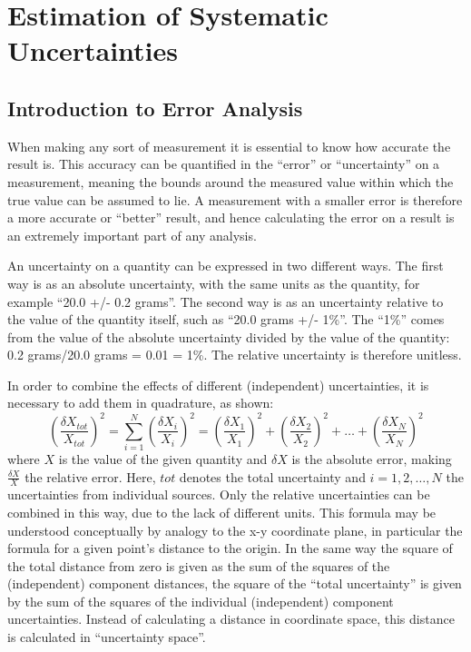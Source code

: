 \section{Estimation of Systematic Uncertainties}
\label{anMeth:Systs}


\subsection{Introduction to Error Analysis}
\label{anMeth:SystsIntro}

When making any sort of measurement it is essential 
to know how accurate the result is.  
This accuracy can be quantified in the 
``error'' or ``uncertainty'' 
on a measurement, 
meaning the bounds around the measured value 
within which the true value can be assumed to lie.  
A measurement with a smaller error is 
therefore a more accurate or ``better'' result, 
and hence calculating the error on a result is 
an extremely important part of 
any analysis.  

An uncertainty on a quantity can be 
expressed in two different ways.  
The first way is as an absolute uncertainty, 
with the same units as the quantity, 
for example ``20.0 +/- 0.2 grams''.  
The second way is as an uncertainty 
relative to the value of the quantity itself, 
such as ``20.0 grams +/- 1\%''.  
The ``1\%'' comes from the value of the absolute 
uncertainty divided by the value of the quantity: 
0.2 grams/20.0 grams = 0.01 = 1\%. 
The relative uncertainty is therefore unitless.  


In order to combine the effects of 
different (independent) uncertainties, 
it is necessary to add them 
in quadrature, as shown:
\[
\left(\frac{\delta X_{tot}}{X_{tot}}\right)^2 
= \sum_{i=1}^{N} \left(\frac{\delta X_i}{X_i}\right)^2 
= \left(\frac{\delta X_1}{X_1}\right)^2 
+ \left(\frac{\delta X_2}{X_2}\right)^2 
+ \ldots
+ \left(\frac{\delta X_N}{X_N}\right)^2 
\]
where 
$X$ is the value of the given quantity and 
$\delta X$ is the absolute error, 
making $\frac{\delta X}{X}$ the relative error.  
Here, $tot$ denotes the total uncertainty 
and $i=1,2,\ldots ,N$ the uncertainties from 
individual sources.  
Only the relative uncertainties 
can be combined in this way, 
due to the lack of different units.  
This formula may be understood 
conceptually by analogy to the 
x-y coordinate plane, in particular 
the formula for a given point's distance 
to the origin.  
In the same way the square of the total distance 
from zero is given as the sum of the squares 
of the (independent) component distances, 
the square of the ``total uncertainty'' 
is given by the sum of the squares of the 
individual (independent) component uncertainties.  
Instead of calculating a distance in %
coordinate space, 
this distance is calculated in 
``uncertainty space''.

